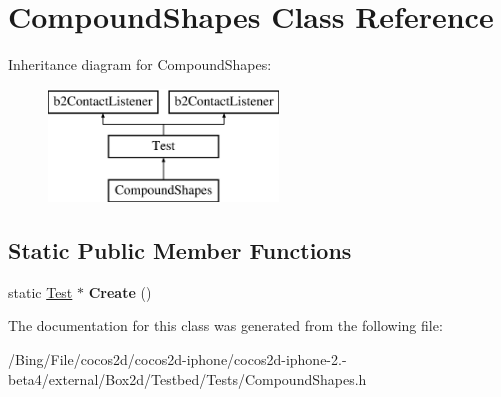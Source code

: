 \hypertarget{class_compound_shapes}{\section{Compound\-Shapes Class Reference}
\label{class_compound_shapes}
}
Inheritance diagram for Compound\-Shapes\-:\begin{figure}[H]
\begin{center}
\leavevmode
\includegraphics[height=3.000000cm]{class_compound_shapes}
\end{center}
\end{figure}
\subsection*{Static Public Member Functions}
\begin{DoxyCompactItemize}
\item 
\hypertarget{class_compound_shapes_aebe51dfc717bf337d5c3fd730a886d2a}{static \hyperlink{class_test}{Test} $\ast$ {\bfseries Create} ()}\label{class_compound_shapes_aebe51dfc717bf337d5c3fd730a886d2a}

\end{DoxyCompactItemize}


The documentation for this class was generated from the following file\-:\begin{DoxyCompactItemize}
\item 
/\-Bing/\-File/cocos2d/cocos2d-\/iphone/cocos2d-\/iphone-\/2.-\/beta4/external/\-Box2d/\-Testbed/\-Tests/Compound\-Shapes.\-h\end{DoxyCompactItemize}
